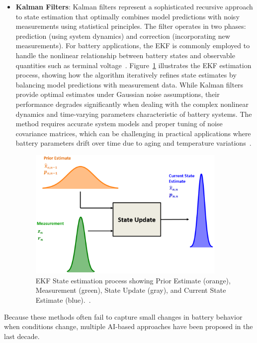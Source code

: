\begin{itemize}
    \item \textbf{Kalman Filters}: Kalman filters represent a sophisticated recursive approach to state estimation that optimally combines model predictions with noisy measurements using statistical principles. The filter operates in two phases: prediction (using system dynamics) and correction (incorporating new measurements). For battery applications, the EKF is commonly employed to handle the nonlinear relationship between battery states and observable quantities such as terminal voltage~\cite{mastali_battery_2013}. Figure~\ref{fig:ekf_diagram} illustrates the EKF estimation process, showing how the algorithm iteratively refines state estimates by balancing model predictions with measurement data. While Kalman filters provide optimal estimates under Gaussian noise assumptions, their performance degrades significantly when dealing with the complex nonlinear dynamics and time-varying parameters characteristic of battery systems. The method requires accurate system models and proper tuning of noise covariance matrices, which can be challenging in practical applications where battery parameters drift over time due to aging and temperature variations~\cite{becker_wwwkalmanfilternet_online_nodate}.

\begin{figure}[htbp]
\centering
\includegraphics[width=0.9\textwidth]{imgs/ekf.png}
\caption{EKF State estimation process showing Prior Estimate (orange), Measurement (green), State Update (gray), and Current State Estimate (blue).~\cite{becker_wwwkalmanfilternet_online_nodate}.}
\label{fig:ekf_diagram}
\end{figure}
    
\end{itemize}

Because these methods often fail to capture small changes in battery behavior when conditions change, multiple AI-based approaches have been proposed in the last decade.

